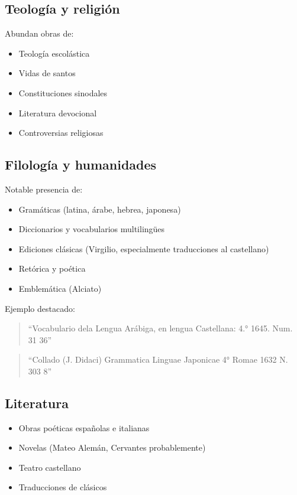 \documentclass[12pt,a4paper]{article}
\begin{document}
\subsection{Teología y religión}

Abundan obras de:
\begin{itemize}
    \item Teología escolástica
    \item Vidas de santos
    \item Constituciones sinodales
    \item Literatura devocional
    \item Controversias religiosas
\end{itemize}

\subsection{Filología y humanidades}

Notable presencia de:

\begin{itemize}
    \item Gramáticas (latina, árabe, hebrea, japonesa)
    \item Diccionarios y vocabularios multilingües
    \item Ediciones clásicas (Virgilio, especialmente traducciones al castellano)
    \item Retórica y poética
    \item Emblemática (Alciato)
\end{itemize}

Ejemplo destacado:

\begin{quote}
``Vocabulario dela Lengua Arábiga, en lengua Castellana: 4.° 1645. Num. 31 36''
\end{quote}

\begin{quote}
``Collado (J. Didaci) Grammatica Linguae Japonicae 4° Romae 1632 N. 303 8''
\end{quote}

\subsection{Literatura}

\begin{itemize}
    \item Obras poéticas españolas e italianas
    \item Novelas (Mateo Alemán, Cervantes probablemente)
    \item Teatro castellano
    \item Traducciones de clásicos
\end{itemize}
\end{document}
